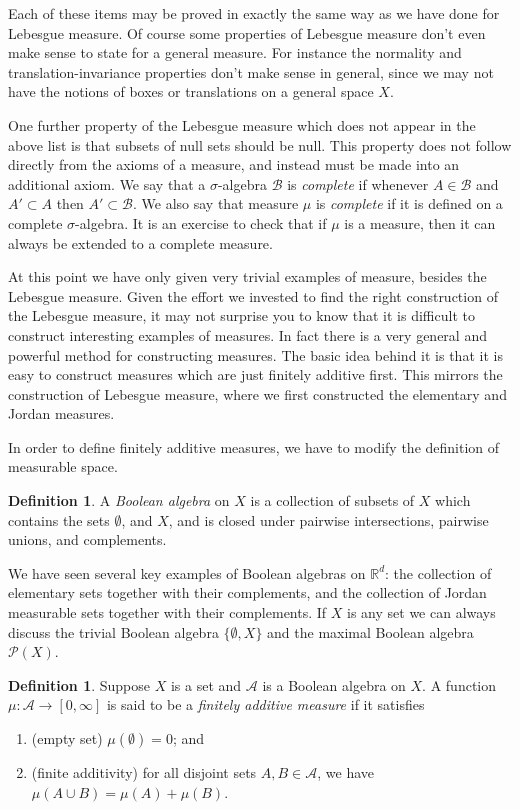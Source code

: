 \documentclass[10pt,oneside]{amsbook}
\newcommand{\RR}{{\mathbb R}}
\theoremstyle{definition}
\theoremstyle{plain}
\theoremstyle{definition}
\newtheorem{defn}[thm]{Definition}
\theoremstyle{remark}
\numberwithin{equation}{section}
\numberwithin{figure}{section}
\begin{document}
Each of these items may be proved in exactly the same way as we have done for Lebesgue measure. Of course some properties of Lebesgue measure don't even make sense to state for a general measure. For instance the normality and translation-invariance properties don't make sense in general, since we may not have the notions of boxes or translations on a general space $X$.

One further property of the Lebesgue measure which does not appear in the above list is that subsets of null sets should be null. This property does not follow directly from the axioms of a measure, and instead must be made into an additional axiom. We say that a $\sigma$-algebra $\mathcal B$ is \emph{complete} if whenever $A\in\mathcal B$ and $A'\subset A$ then $A'\subset\mathcal B$. We also say that measure $\mu$ is \emph{complete} if it is defined on a complete $\sigma$-algebra. It is an exercise to check that if $\mu$ is a measure, then it can always be extended to a complete measure.

At this point we have only given very trivial examples of measure, besides the Lebesgue measure. Given the effort we invested to find the right construction of the Lebesgue measure, it may not surprise you to know that it is difficult to construct interesting examples of measures. In fact there is a very general and powerful method for constructing measures. The basic idea behind it is that it is easy to construct measures which are just finitely additive first. This mirrors the construction of Lebesgue measure, where we first constructed the elementary and Jordan measures.

In order to define finitely additive measures, we have to modify the definition of measurable space.

\begin{defn}
  A \emph{Boolean algebra} on $X$ is a collection of subsets of $X$ which contains the sets $\emptyset$, and $X$, and is closed under pairwise intersections, pairwise unions, and complements.
\end{defn}

We have seen several key examples of Boolean algebras on $\RR^d$: the collection of elementary sets together with their complements, and the collection of Jordan measurable sets together with their complements. If $X$ is any set we can always discuss the trivial Boolean algebra $\{\emptyset,X\}$ and the maximal Boolean algebra $\mathcal P(X)$.

\begin{defn}
  Suppose $X$ is a set and $\mathcal A$ is a Boolean algebra on $X$. A function $\mu\colon\mathcal A\to[0,\infty]$ is said to be a \emph{finitely additive measure} if it satisfies
  \begin{enumerate}
  \item (empty set) $\mu(\emptyset)=0$; and
  \item (finite additivity) for all disjoint sets $A,B\in\mathcal A$, we have $\mu(A\cup B)=\mu(A)+\mu(B)$.
  \end{enumerate}
\end{defn}
\end{document}

